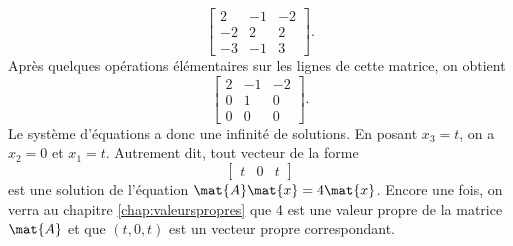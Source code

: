\begin{exercice}
\begin{sol}
\begin{enumerate}
\begin{displaymath}
\begin{bmatrix}
          2 & -1 & -2 \\ -2 & 2 & 2 \\ -3 & -1 & 3
        \end{bmatrix}.
      \end{displaymath}
      Après quelques opérations élémentaires sur les lignes de cette
      matrice, on obtient
      \begin{displaymath}
        \begin{bmatrix}
          2 & -1 & -2 \\ 0 & 1 & 0 \\ 0 & 0 & 0
        \end{bmatrix}.
      \end{displaymath}
      Le système d'équations a donc une infinité de solutions. En
      posant $x_3 = t$, on a $x_2 = 0$ et $x_1 = t$. Autrement dit,
      tout vecteur de la forme
      \begin{displaymath}
        \begin{bmatrix}
          t & 0 & t
        \end{bmatrix}
      \end{displaymath}
      est une solution de l'équation $\mat{A} \mat{x} = 4 \mat{x}$.
      Encore une fois, on verra au chapitre \ref{chap:valeurspropres}
      que 4 est une valeur propre de la matrice $\mat{A}$ et que $(t,
      0, t)$ est un vecteur propre correspondant.
    \end{enumerate}
  \end{sol}
\end{exercice}

